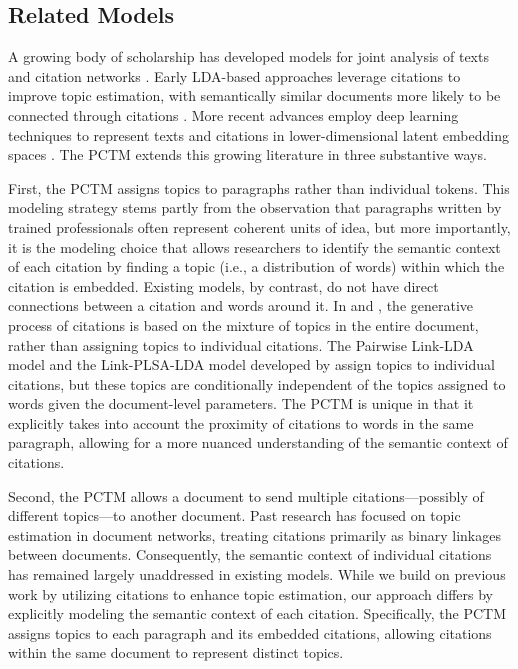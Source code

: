 \subsection{Related Models}
\label{sec:relatedmodels}

A growing body of scholarship has developed models for joint analysis of texts and citation networks \citep{chang2010hrtm, liu2009topic, bai2018neural, le2014probabilistic, zhang2020topic}. 
Early LDA-based approaches leverage citations to improve topic estimation, with semantically similar documents more likely to be connected through citations \citep{chang2010hrtm, liu2009topic, nallapati2008joint}. 
More recent advances employ deep learning techniques to represent texts and citations in lower-dimensional latent embedding spaces \citep{bai2018neural, zhang2022dynamic}. 
The PCTM extends this growing literature in three substantive ways.

First, the PCTM assigns topics to paragraphs rather than individual tokens. 
This modeling strategy stems partly from the observation that paragraphs written by trained professionals often represent coherent units of idea, but more importantly, it is the modeling choice that allows researchers to identify the semantic context of each citation by finding a topic (i.e., a distribution of words) within which the citation is embedded.
Existing models, by contrast, do not have direct connections between a citation and words around it.
In \citet{chang2010hrtm} and \citet{liu2009topic}, the generative process of citations is based on the mixture of topics in the entire document, rather than assigning topics to individual citations.
The Pairwise Link-LDA model and the Link-PLSA-LDA model developed by \citet{nallapati2008joint} assign topics to individual citations, but these topics are conditionally independent of the topics assigned to words given the document-level parameters.
The PCTM is unique in that it explicitly takes into account the proximity of citations to words in the same paragraph, allowing for a more nuanced understanding of the semantic context of citations.

Second, the PCTM allows a document to send multiple citations---possibly of different topics---to another document. 
Past research has focused on topic estimation in document networks, treating citations primarily as binary linkages between documents. 
Consequently, the semantic context of individual citations has remained largely unaddressed in existing models.
While we build on previous work by utilizing citations to enhance topic estimation, our approach differs by explicitly modeling the semantic context of each citation.
Specifically, the PCTM assigns topics to each paragraph and its embedded citations, allowing citations within the same document to represent distinct topics.

